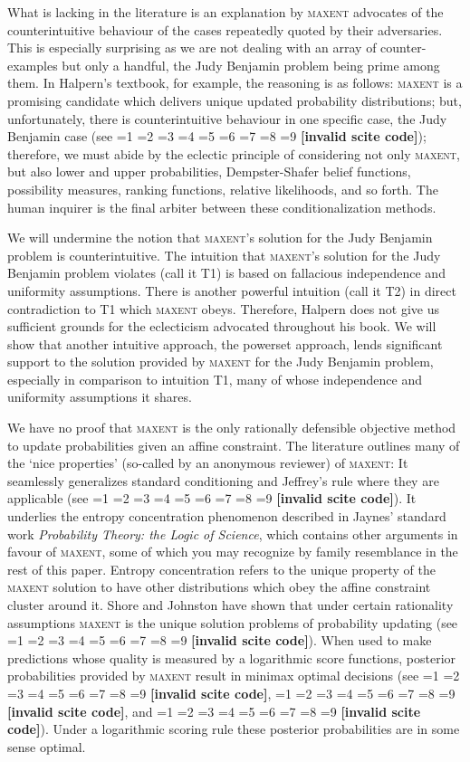 \documentclass[smallextended]{svjour3}       %
\newcommand{\qnull}[1]{`#1'}
\newcommand{\PageP}{p.~}
\newcommand{\PageP}{}
\newcommand{\scite}[3]{\ifnum#1=1\cite{#2}\else
\ifnum#1=2\cite[{\PageP}~#3]{#2}\else
\ifnum#1=3\cite[{\PageP}~#3]{#2}\else
\ifnum#1=4\cite{#2}\else
\ifnum#1=5\cite{#2}\else
\ifnum#1=6\cite[{\PageP}~#3]{#2}\else
\ifnum#1=7\cite{#2}\else
\ifnum#1=8\cite[{\PageP}~#3]{#2}\else
\ifnum#1=9\cite[{\PageP}~#3]{#2}\else
\textbf{[invalid scite code]}\fi\fi\fi\fi\fi\fi\fi\fi\fi}
\begin{document}
What is lacking in the literature is an explanation by \textsc{maxent}
advocates of the counterintuitive behaviour of the cases repeatedly
quoted by their adversaries. This is especially surprising as we are
not dealing with an array of counter-examples but only a handful, the
Judy Benjamin problem being prime among them. In Halpern's textbook,
for example, the reasoning is as follows: \textsc{maxent} is a
promising candidate which delivers unique updated probability
distributions; but, unfortunately, there is counterintuitive behaviour
in one specific case, the Judy Benjamin case (see
\scite{8}{halpern03}{110, 119}); therefore, we must abide by the
eclectic principle of considering not only \textsc{maxent}, but also
lower and upper probabilities, Dempster-Shafer belief functions,
possibility measures, ranking functions, relative likelihoods, and so
forth. The human inquirer is the final arbiter between these
conditionalization methods.

We will undermine the notion that \textsc{maxent}'s solution for the
Judy Benjamin problem is counterintuitive. The intuition that
\textsc{maxent}'s solution for the Judy Benjamin problem violates
(call it T1) is based on fallacious independence and uniformity
assumptions. There is another powerful intuition (call it T2) in
direct contradiction to T1 which \textsc{maxent} obeys. Therefore,
Halpern does not give us sufficient grounds for the eclecticism
advocated throughout his book. We will show that another intuitive
approach, the powerset approach, lends significant support to the
solution provided by \textsc{maxent} for the Judy Benjamin problem,
especially in comparison to intuition T1, many of whose independence
and uniformity assumptions it shares. 

We have no proof that \textsc{maxent} is the only rationally
defensible objective method to update probabilities given an affine
constraint. The literature outlines many of the \qnull{nice
  properties} (so-called by an anonymous reviewer) of \textsc{maxent}:
It seamlessly generalizes standard conditioning and Jeffrey's rule
where they are applicable (see \scite{7}{catichagiffin06}{}). It
underlies the entropy concentration phenomenon described in Jaynes'
standard work \emph{Probability Theory: the Logic of Science}, which
contains other arguments in favour of \textsc{maxent}, some of which
you may recognize by family resemblance in the rest of this paper.
Entropy concentration refers to the unique property of the
\textsc{maxent} solution to have other distributions which obey the
affine constraint cluster around it. Shore and Johnston have shown
that under certain rationality assumptions \textsc{maxent} is the
unique solution problems of probability updating (see
\scite{7}{shorejohnson80}{}). When used to make predictions whose
quality is measured by a logarithmic score functions, posterior
probabilities provided by \textsc{maxent} result in minimax optimal
decisions (see \scite{7}{topsoe79}{}, \scite{7}{walley91}{}, and
\scite{7}{grunwald00a}{}). Under a logarithmic scoring rule these
posterior probabilities are in some sense optimal.
\end{document}
